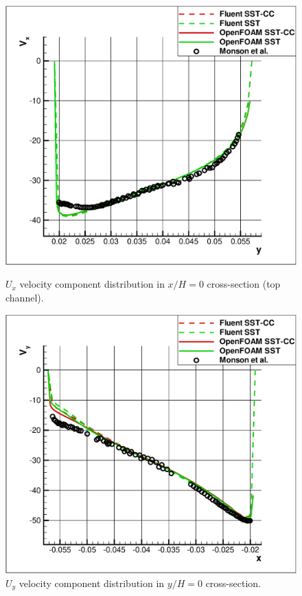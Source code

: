 \documentclass[a4paper]{jpconf}
\begin{document}
\begin{figure}[ht]
	\begin{minipage}{0.475\linewidth}
		\includegraphics[scale=0.33]{xh0up}
		\caption{$U_x$ velocity component distribution in $x/H=0$ cross-section (top channel).}
		\label{fig:x0up}
	\end{minipage}
	\hspace{0.5em}
	\begin{minipage}{0.475\linewidth}
		\includegraphics[scale=0.33]{yh0}
		\caption{$U_y$ velocity component distribution in $y/H=0$ cross-section.}
		\label{fig:y0}
	\end{minipage}
\end{figure}
\end{document}
